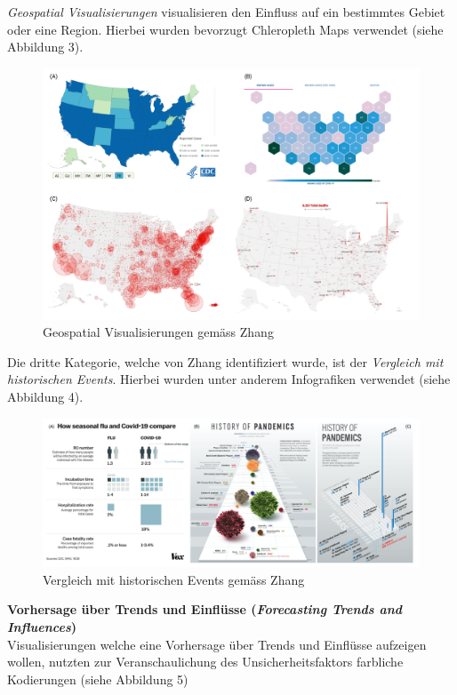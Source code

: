 \documentclass[12pt, oneside]{article}
\begin{document}
\clearpage
\textit{Geospatial Visualisierungen} visualisieren den Einfluss auf ein bestimmtes Gebiet oder eine Region. Hierbei wurden bevorzugt Chleropleth Maps verwendet (siehe Abbildung 3).

\begin{figure}[ht]
	\includegraphics[width=12cm]{images/geospatial_visualizations.png}
	\centering
	\caption{Geospatial Visualisierungen gemäss Zhang ~\citep[S. 8]{YixuanZhang.}}
\end{figure}

Die dritte Kategorie, welche von Zhang identifiziert wurde, ist der \textit{Vergleich mit historischen Events}. Hierbei wurden unter anderem Infografiken verwendet (siehe Abbildung 4).


\begin{figure}[ht]
	\includegraphics[width=12cm]{images/historic_events_visualizations.png}
	\centering
	\caption{Vergleich mit historischen Events gemäss Zhang ~\citep[S. 8]{YixuanZhang.}}
\end{figure}

\clearpage
\textbf{Vorhersage über Trends und Einflüsse (\textit{Forecasting Trends and Influences})}\\
Visualisierungen welche eine Vorhersage über Trends und Einflüsse aufzeigen wollen, nutzten zur Veranschaulichung des Unsicherheitsfaktors farbliche Kodierungen (siehe Abbildung 5)
\end{document}
